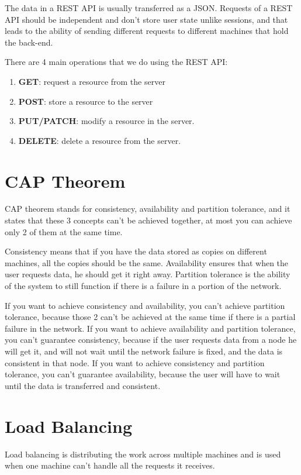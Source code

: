 The data in a REST API is usually transferred as a JSON. Requests of a REST API should be independent and don't store user state unlike sessions, and that leads to the ability of sending different requests to different machines that hold the back-end.

There are 4 main operations that we do using the REST API:
\begin{enumerate}
    \item \textbf{GET}: request a resource from the server
    \item \textbf{POST}: store a resource to the server
    \item \textbf{PUT/PATCH}: modify a resource in the server.
    \item \textbf{DELETE}: delete a resource from the server.
\end{enumerate}

\section{CAP Theorem}
\label{sec:cap}
CAP theorem stands for consistency, availability and partition tolerance, and it states that these 3 concepts can't be achieved together, at most you can achieve only 2 of them at the same time.

Consistency means that if you have the data stored as copies on different machines, all the copies should be the same. 
Availability ensures that when the user requests data, he should get it right away.
Partition tolerance is the ability of the system to still function if there is a failure in a portion of the network.

If you want to achieve consistency and availability, you can't achieve partition tolerance, because those 2 can't be achieved at the same time if there is a partial failure in the network. 
If you want to achieve availability and partition tolerance, you can't guarantee consistency, because if the user requests data from a node he will get it, and will not wait until the network failure is fixed, and the data is consistent in that node. 
If you want to achieve consistency and partition tolerance, you can't guarantee availability, because the user will have to wait until the data is transferred and consistent.

\section{Load Balancing}
\label{sec:Load}
Load balancing is distributing the work across multiple machines and is used when one machine can't handle all the requests it receives.

